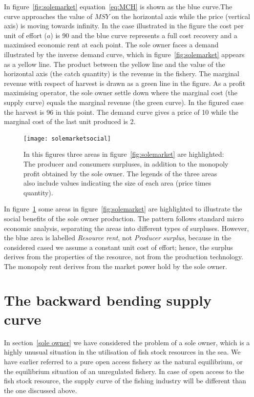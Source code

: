 \documentclass[11pt,fleqn]{book} %
\begin{document}
In figure~\ref{fig:solemarket} equation~\ref{eq:MCH} is shown as the blue curve.The curve approaches the value of $MSY$ on the horizontal axis while the price (vertical axis) is moving towards infinity. In the case illustrated in the figure the cost per unit of effort ($a$) is 90 and the blue curve represents a full cost recovery and a maximised economic rent at each point. The sole owner faces a demand illustrated by the inverse demand curve, which in figure~\ref{fig:solemarket} appears as a yellow line. The product between the yellow line and the value of the horizontal axis (the catch quantity) is the revenue in the fishery. The marginal revenue with respect of harvest is drawn as a green line in the figure. As a profit maximising operator, the sole owner settle down where the marginal cost (the supply curve) equals the marginal revenue (the green curve). In the figured case the harvest is 96 in this point. The demand curve gives a price of 10 while the marginal cost of the last unit produced is 2.  

\begin{figure}[ht]
\centering
\texttt{[image: solemarketsocial]}
\caption{In this figures three areas in figure~\ref{fig:solemarket} are highlighted: The producer and consumers surpluses, in addition to the monopoly profit obtained by the sole owner. The legends of the three areas also include values indicating the size of each area (price times quantity).} 
\label{fig:solemarketsocial}
\end{figure}

In figure~\ref{fig:solemarketsocial} some areas in figure~\ref{fig:solemarket} are highlighted to illustrate the social benefits of the sole owner production. The pattern follows standard micro economic analysis, separating the areas into different types of surpluses. However, the blue area is labelled \textit{Resource rent}, not \textit{Producer surplus}, because in the considered cased we assume a constant unit cost of effort; hence, the surplus derives from the properties of the resource, not from the production technology. The monopoly rent derives from the market power hold by the sole owner.


\section{The backward bending supply curve}\label{section:openaccess}
In section~\ref{sole owner} we have considered the problem of a sole owner, which is a highly unusual situation in the utilisation of fish stock resources in the sea. We have earlier referred to a pure open access fishery as the natural equilibrium, or the equilibrium situation of an unregulated fishery. In case of open access to the fish stock resource, the supply curve of the fishing industry will be different than the one discussed above. 
\end{document}
